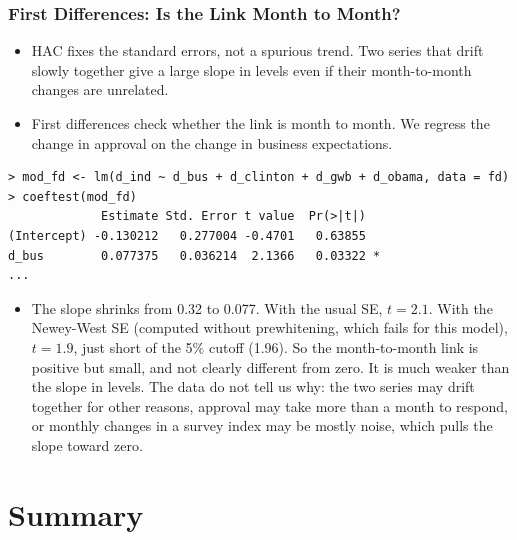 \documentclass[xcolor=svgnames,9pt,english,aspectratio=169,t]{beamer}
\begin{document}
\begin{frame}[fragile]
\frametitle{First Differences: Is the Link Month to Month?}
\small
\begin{itemize}
\item HAC fixes the standard errors, not a spurious trend. Two series that drift slowly together give a large slope in levels even if their month-to-month changes are unrelated.
\item First differences check whether the link is month to month. We regress the change in approval on the change in business expectations.
\end{itemize}
\begin{Verbatim}[fontsize=\scriptsize, frame=single, label=R Code, commandchars=\\\{\}]
> mod_fd <- lm(d_ind ~ d_bus + d_clinton + d_gwb + d_obama, data = fd)
> coeftest(mod_fd)
             Estimate Std. Error t value  Pr(>|t|)
(Intercept) -0.130212   0.277004 -0.4701   0.63855
d_bus        0.077375   0.036214  2.1366   0.03322 *
...
\end{Verbatim}
\pause
\begin{itemize}
\item The slope shrinks from 0.32 to 0.077. With the usual SE, $t = 2.1$. With the Newey-West SE (computed without prewhitening, which fails for this model), $t = 1.9$, just short of the 5\% cutoff (1.96). So the month-to-month link is positive but small, and not clearly different from zero. It is much weaker than the slope in levels. The data do not tell us why: the two series may drift together for other reasons, approval may take more than a month to respond, or monthly changes in a survey index may be mostly noise, which pulls the slope toward zero.
\end{itemize}
\end{frame}



%


\section{Summary}
\end{document}
